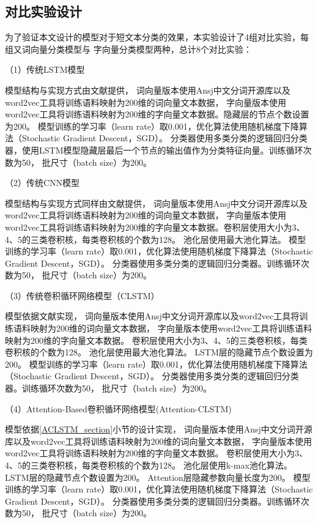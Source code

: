 \subsection{对比实验设计}
为了验证本文设计的模型对于短文本分类的效果，本实验设计了4组对比实验，每组又词向量分类模型与
字向量分类模型两种，总计8个对比实验：

（1）传统LSTM模型

模型结构与实现方式由文献\cite{zhou2016compositional}提供，
词向量版本使用Ansj中文分词开源库以及word2vec工具将训练语料映射为200维的词向量文本数据，
字向量版本使用word2vec工具将训练语料映射为200维的字向量文本数据。隐藏层的节点个数设置为200。
模型训练的学习率（learn rate）取0.001，优化算法使用随机梯度下降算法（Stochastic Gradient Descent，SGD）。
分类器使用多类分类的逻辑回归分类器，使用LSTM模型隐藏层最后一个节点的输出值作为分类特征向量。训练循环次数为50，
批尺寸（batch size）为200。

（2）传统CNN模型

模型结构与实现方式同样由文献\cite{zhou2016compositional}提供，
词向量版本使用Ansj中文分词开源库以及word2vec工具将训练语料映射为200维的词向量文本数据，
字向量版本使用word2vec工具将训练语料映射为200维的字向量文本数据。卷积层使用大小为3、4、5的三类卷积核，每类卷积核的个数为128。
池化层使用最大池化算法。
模型训练的学习率（learn rate）取0.001，优化算法使用随机梯度下降算法（Stochastic Gradient Descent，SGD）。
分类器使用多类分类的逻辑回归分类器。训练循环次数为50，
批尺寸（batch size）为200。

（3）传统卷积循环网络模型（CLSTM）

模型依据文献\cite{Zhou2015A}实现，
词向量版本使用Ansj中文分词开源库以及word2vec工具将训练语料映射为200维的词向量文本数据，
字向量版本使用word2vec工具将训练语料映射为200维的字向量文本数据。
卷积层使用大小为3、4、5的三类卷积核，每类卷积核的个数为128。
池化层使用最大池化算法。
LSTM层的隐藏节点个数设置为200。
模型训练的学习率（learn rate）取0.001，优化算法使用随机梯度下降算法（Stochastic Gradient Descent，SGD）。
分类器使用多类分类的逻辑回归分类器。训练循环次数为50，
批尺寸（batch size）为200。

（4）Attention-Based卷积循环网络模型(Attention-CLSTM)

模型依据\ref{ACLSTM_section}小节的设计实现，
词向量版本使用Ansj中文分词开源库以及word2vec工具将训练语料映射为200维的词向量文本数据，
字向量版本使用word2vec工具将训练语料映射为200维的字向量文本数据。
卷积层使用大小为3、4、5的三类卷积核，每类卷积核的个数为128。
池化层使用k-max池化算法。
LSTM层的隐藏节点个数设置为200。
Attention层隐藏参数向量长度为200。
模型训练的学习率（learn rate）取0.001，优化算法使用随机梯度下降算法（Stochastic Gradient Descent，SGD）。
分类器使用多类分类的逻辑回归分类器。训练循环次数为50，
批尺寸（batch size）为200。

